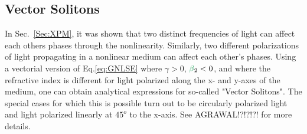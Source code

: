 \subsection{Vector Solitons}
In Sec.~\ref{Sec:XPM}, it was shown that two distinct frequencies of light can affect each others phases through the nonlinearity. Similarly, two different polarizations of light propagating in a nonlinear medium can affect each other's phases. Using a vectorial version of Eq.\ref{eq:GNLSE} where $\gamma>0$, $\betag_2<0$, and where the refractive index is different for light polarized along the x- and y-axes of the medium, one can obtain analytical expressions for so-called "Vector Solitons". The special cases for which this is possible turn out to be circularly polarized light and light polarized linearly at $45^{o}$ to the x-axis. See AGRAWAL!?!?!?! for more details. 






